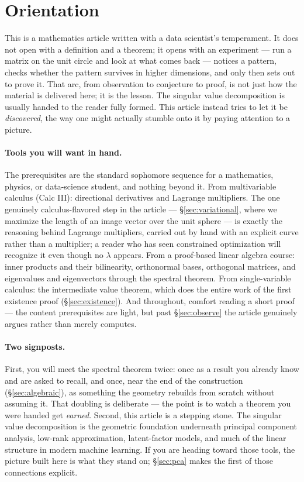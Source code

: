 \documentclass[11pt]{article}
\numberwithin{equation}{section}
\theoremstyle{plainish}
\begin{document}
\section*{Orientation}

This is a mathematics article written with a data scientist's temperament. It
does not open with a definition and a theorem; it opens with an experiment ---
run a matrix on the unit circle and look at what comes back --- notices a
pattern, checks whether the pattern survives in higher dimensions, and only then
sets out to prove it. That arc, from observation to conjecture to proof, is not
just how the material is delivered here; it is the lesson. The singular value
decomposition is usually handed to the reader fully formed. This article instead
tries to let it be \emph{discovered}, the way one might actually stumble onto it
by paying attention to a picture.

\paragraph{Tools you will want in hand.} The prerequisites are the standard
sophomore sequence for a mathematics, physics, or data-science student, and
nothing beyond it. From multivariable calculus (Calc III): directional
derivatives and Lagrange multipliers. The one genuinely calculus-flavored step
in the article --- \S\ref{sec:variational}, where we maximize the length of an
image vector over the unit sphere --- is exactly the reasoning behind Lagrange
multipliers, carried out by hand with an explicit curve rather than a multiplier;
a reader who has seen constrained optimization will recognize it even though no
$\lambda$ appears. From a proof-based linear algebra course: inner products and
their bilinearity, orthonormal bases, orthogonal matrices, and
eigenvalues and eigenvectors through the spectral theorem. From single-variable
calculus: the intermediate value theorem, which does the entire work of the
first existence proof (\S\ref{sec:existence}). And throughout, comfort reading a
short proof --- the content prerequisites are light, but past
\S\ref{sec:observe} the article genuinely argues rather than merely computes.

\paragraph{Two signposts.} First, you will meet the spectral theorem twice: once
as a result you already know and are asked to recall, and once, near the end of
the construction (\S\ref{sec:algebraic}), as something the geometry rebuilds from
scratch without assuming it. That doubling is deliberate --- the point is to
watch a theorem you were handed get \emph{earned}. Second, this article is a
stepping stone. The singular value decomposition is the geometric foundation
underneath principal component analysis, low-rank approximation, latent-factor
models, and much of the linear structure in modern machine learning. If you are
heading toward those tools, the picture built here is what they stand on;
\S\ref{sec:pca} makes the first of those connections explicit.
\end{document}
